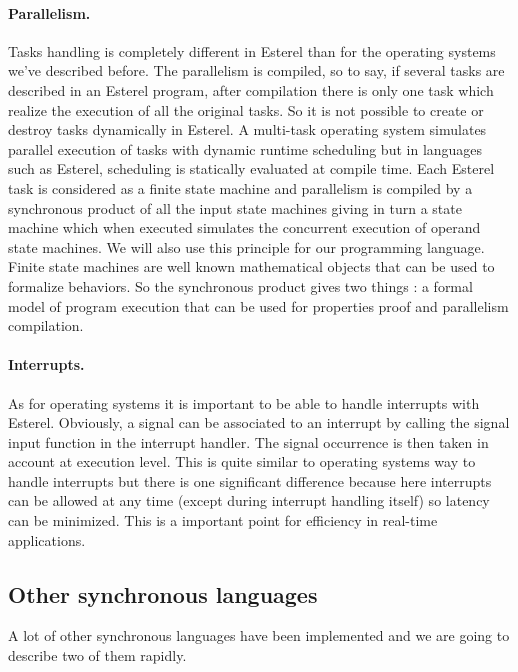 \documentclass[10pt]{report}
\begin{document}
\paragraph{Parallelism.} Tasks handling is completely different in Esterel than for the operating systems we've described before.
The parallelism is compiled, so to say, if several tasks are described in an Esterel program, after compilation there is only
one task which realize the execution of all the original tasks. So it is not possible to create or destroy tasks dynamically
in Esterel. A multi-task operating system simulates parallel execution of tasks with dynamic runtime scheduling but in languages
such as Esterel, scheduling is statically evaluated at compile time. Each Esterel task is considered as a finite state machine
and parallelism is compiled by a synchronous product of all the input state machines giving in turn a state machine which
when executed simulates the concurrent execution of operand state machines. We will also use this principle for our programming
language. Finite state machines are well known mathematical objects that can be used to formalize behaviors. So the synchronous
product gives two things : a formal model of program execution that can be used for properties proof and parallelism compilation.

\paragraph{Interrupts.} As for operating systems it is important to be able to handle interrupts with Esterel. Obviously, a signal
can be associated to an interrupt by calling the signal input function in the interrupt handler. The signal occurrence is then
taken in account at execution level. This is quite similar to operating systems way to handle interrupts but there is one
significant difference because here interrupts can be allowed at any time (except during interrupt handling itself) so latency
can be minimized. This is a important point for efficiency in real-time applications.

\subsection{Other synchronous languages}

A lot of other synchronous languages have been implemented and we are going to describe two of them rapidly.
\end{document}
